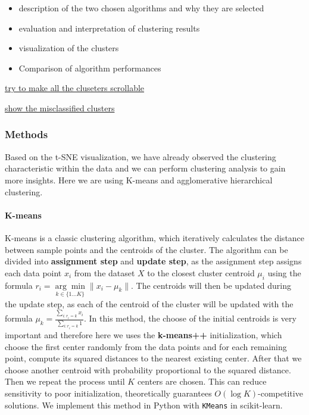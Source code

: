 \documentclass{article}
\begin{document}




\begin{itemize}
    \item description of the two chosen algorithms and why they are selected
    \item evaluation and interpretation of clustering results
    \item visualization of the clusters
    \item Comparison of algorithm performances
\end{itemize}

\underline{try to make all the cluseters scrollable}

\underline{show the misclassified clusters}

\subsubsection*{Methods}

Based on the t-SNE visualization, we have already observed the clustering characteristic within the data and we can perform clustering analysis to gain more insights. Here we are using K-means and agglomerative hierarchical clustering.

\paragraph{K-means} K-means is a classic clustering algorithm, which iteratively calculates the distance between sample points and the centroids of the cluster. The algorithm can be divided into \textbf{assignment step} and \textbf{update step}, as the assignment step assigns each data point $x_i$ from the dataset $X$ to the closest cluster centroid $\mu_i$ using the formula $r_i = \underset{k\in \{1\ldots K\} }{\arg\min}{ \|x_{i}-\mu_k\| }$. The centroids will then be updated during the
update step, as each of the centroid of the cluster will be updated with the formula $\mu_k = \frac{\sum_{i:r_i=k}^{} x_i}{\sum_{i:r_i=k}^{} 1}$. In this method, the choose of the initial centroids is very important and therefore here we uses the \textbf{k-means++} initialization, which choose the first center randomly from the data points and for each remaining point, compute its squared distances to the nearest existing center. After that we choose another centroid with
probability proportional to the squared distance. Then we repeat the process until $K$ centers are chosen. This can reduce sensitivity to poor initialization, theoretically guarantees $O(\log K)$-competitive solutions. We implement this method in Python with \texttt{KMeans} in scikit-learn.
\end{document}

